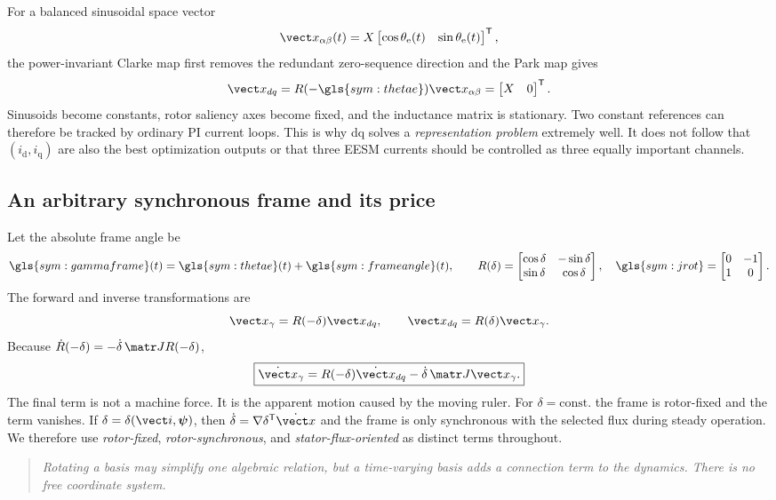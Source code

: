 For a balanced sinusoidal space vector
\[
 \vect x_{\alpha\beta}(t)=X
 \begin{bmatrix}\cos\theta_{\mathrm e}(t)&\sin\theta_{\mathrm e}(t)\end{bmatrix}^{\mathsf T},
\]
the power-invariant Clarke map first removes the redundant zero-sequence
direction and the Park map gives
\[
 \vect x_{dq}=R(-\gls{sym:thetae})\vect x_{\alpha\beta}
 =\begin{bmatrix}X&0\end{bmatrix}^{\mathsf T}.
\]
Sinusoids become constants, rotor saliency axes become fixed, and the
inductance matrix is stationary. Two constant references can therefore be
tracked by ordinary PI current loops. This is why \gls{dq} solves a
\emph{representation problem} extremely well. It does not follow that
\((i_{\mathrm d},i_{\mathrm q})\) are also the best optimization outputs or
that three EESM currents should be controlled as three equally important
channels.



\subsection{An arbitrary synchronous frame and its price}

Let the absolute frame angle be
\[
 \gls{sym:gammaframe}(t)=\gls{sym:thetae}(t)+\gls{sym:frameangle}(t),\qquad
 R(\delta)=\begin{bmatrix}\cos\delta&-\sin\delta\\
 \sin\delta&\cos\delta\end{bmatrix},\quad
 \gls{sym:jrot}=\begin{bmatrix}0&-1\\1&0\end{bmatrix}.
\]
The forward and inverse transformations are
\begin{equation}
 \vect x_\gamma=R(-\delta)\vect x_{dq},\qquad
 \vect x_{dq}=R(\delta)\vect x_\gamma.
 \label{eq:arbitrary-frame-map}
\end{equation}
Because \(\dot R(-\delta)=-\dot\delta\,\matr J R(-\delta)\),
\begin{equation}
 \boxed{\dot{\vect x}_\gamma
 =R(-\delta)\dot{\vect x}_{dq}
 -\dot\delta\,\matr J\vect x_\gamma.}
 \label{eq:arbitrary-frame-rate}
\end{equation}
The final term is not a machine force. It is the apparent motion caused by
the moving ruler. For \(\delta=\mathrm{const.}\) the frame is rotor-fixed and
the term vanishes. If \(\delta=\delta(\vect i,\boldsymbol\psi)\), then
\(\dot\delta=\nabla\delta^{\mathsf T}\dot{\vect x}\) and the frame is only
synchronous with the selected flux during steady operation. We therefore use
\emph{rotor-fixed}, \emph{rotor-synchronous}, and
\emph{stator-flux-oriented} as distinct terms throughout.

\begin{quote}\itshape
Rotating a basis may simplify one algebraic relation, but a time-varying basis
adds a connection term to the dynamics. There is no free coordinate system.
\end{quote}
